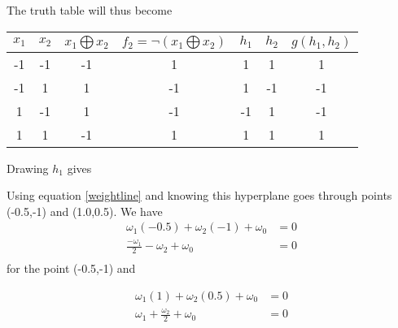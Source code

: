 \documentclass[10pt,a4paper]{article}
\begin{document}
The truth table will thus become

\begin{tabular}{|c|c|c|c|c|c|c|}
\hline
$x_1$ & $x_2$ & $x_1 \bigoplus x_2$ & $f_2 =\neg (x_1 \bigoplus x_2)$ & $h_1$ & $h_2$ &$g(h_1,h_2)$\\
\hline
-1 &-1 &-1 & 1 & 1 & 1 & 1  \\
-1 & 1 & 1 &-1 & 1 &-1 & -1 \\
 1 &-1 & 1 &-1 &-1 & 1 & -1 \\
 1 & 1 &-1 & 1 & 1 & 1 & 1  \\
\hline
\end{tabular}

Drawing $h_1$ gives

\begin{center}
\end{center}

Using equation \ref{weightline} and knowing this hyperplane goes through points (-0.5,-1) and (1.0,0.5).
We have  
\begin{equation}
\label{2bh1p1}
\begin{split}
\omega_1(-0.5) + \omega_2(-1) + \omega_0 &= 0 \\
\frac{-\omega_1}{2} - \omega_2 + \omega_0 &= 0 \\
\end{split}
\end{equation}
for the point (-0.5,-1) and

\begin{equation}
\label{2bh1p2}
\begin{split}
\omega_1(1) + \omega_2(0.5) + \omega_0 &= 0 \\
\omega_1 + \frac{\omega_2}{2} + \omega_0 &= 0 \\
\end{split}
\end{equation}
\end{document}
